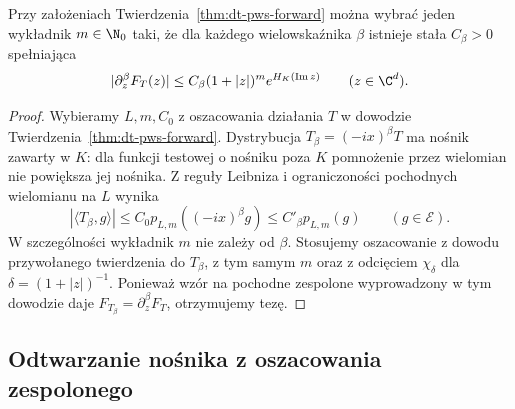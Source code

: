 \begin{wniosek}
\label{cor:dt-pws-derivatives}
Przy założeniach Twierdzenia~\ref{thm:dt-pws-forward}
można wybrać jeden wykładnik $m\in\N_0$ taki, że
dla każdego wielowskaźnika $\beta$ istnieje stała
$C_\beta>0$ spełniająca
\[
 |\partial_z^\beta F_T(z)|
 \le C_\beta(1+|z|)^m e^{H_K(\operatorname{Im}z)}
 \qquad(z\in\C^d).
\]
\end{wniosek}
\begin{proof}
Wybieramy $L,m,C_0$ z oszacowania działania $T$
w dowodzie Twierdzenia~\ref{thm:dt-pws-forward}.
Dystrybucja $T_\beta=(-ix)^\beta T$ ma nośnik
zawarty w $K$: dla funkcji testowej o nośniku
poza $K$ pomnożenie przez wielomian nie powiększa
jej nośnika. Z reguły Leibniza i ograniczoności
pochodnych wielomianu na $L$ wynika
\[
 |\langle T_\beta,g\rangle|
 \le C_0p_{L,m}((-ix)^\beta g)
 \le C'_\beta p_{L,m}(g)
 \qquad(g\in\mathcal E).
\]
W szczególności wykładnik $m$ nie zależy od $\beta$.
Stosujemy oszacowanie z dowodu przywołanego twierdzenia
do $T_\beta$, z tym samym $m$ oraz z odcięciem
$\chi_\delta$ dla $\delta=(1+|z|)^{-1}$.
Ponieważ wzór na pochodne zespolone wyprowadzony
w tym dowodzie daje $F_{T_\beta}=\partial_z^\beta F_T$,
otrzymujemy tezę.
\end{proof}

\subsection{Odtwarzanie nośnika z oszacowania zespolonego}

